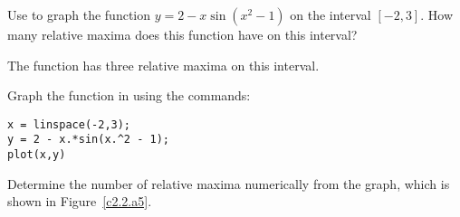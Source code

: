 \documentclass{ximera}
\begin{document}
\begin{computerExercise} \label{c2.2.a5}
Use \Matlab to graph the function $y = 2 - x\sin(x^2-1)$ on the interval
$[-2,3]$.  How many relative maxima does this function have on this interval?

\begin{solution}

\ans The function has three relative maxima on this interval.

\soln Graph the function in \Matlab using the commands:
\begin{verbatim}
x = linspace(-2,3);
y = 2 - x.*sin(x.^2 - 1);
plot(x,y)
\end{verbatim}
Determine the number of relative maxima numerically from the graph, which
is shown in Figure~\ref{c2.2.a5}.

\begin{figure}[htb]
                       \centerline{%
                       }
\end{figure}








\end{solution}
\end{computerExercise}
\end{document}
